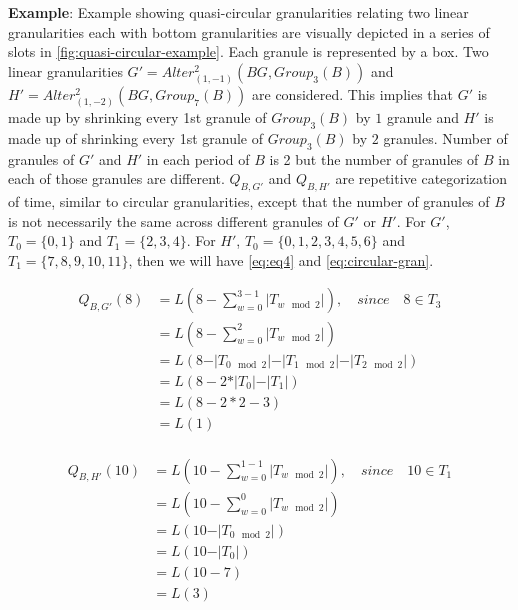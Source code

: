 \documentclass[12pt]{article}
\begin{document}
\textbf{Example}: Example showing quasi-circular granularities relating two linear granularities each with bottom granularities are visually depicted in a series of slots in \autoref{fig:quasi-circular-example}. Each granule is represented by a box. Two linear granularities \(G' = Alter^{2}_{(1,-1)}(BG, Group_3(B))\) and \(H' = Alter^{2}_{(1,-2)}(BG, Group_7(B))\) are considered. This implies that \(G'\) is made up by shrinking every 1st granule of \(Group_3(B)\) by \(1\) granule and \(H'\) is made up of shrinking every 1st granule of \(Group_3(B)\) by \(2\) granules. Number of granules of \(G'\) and \(H'\) in each period of \(B\) is 2 but the number of granules of \(B\) in each of those granules are different. \(Q_{B, G'}\) and \(Q_{B, H'}\) are repetitive categorization of time, similar to circular granularities, except that the number of granules of \(B\) is not necessarily the same across different granules of \(G'\) or \(H'\). For \(G'\), \(T_0 = \{0,1\}\) and \(T_1 = \{2, 3, 4\}\). For \(H'\), \(T_0 = \{0, 1, 2, 3, 4, 5, 6\}\) and \(T_1 = \{7, 8, 9, 10, 11\}\), then we will have \autoref{eq:eq4} and \autoref{eq:circular-gran}.

\begin{equation} \label{eq:eq4}
\begin{split}
Q_{B,G'}(8) & = L(8 - \sum_{w=0}^{3-1}\vert T_{w \mod 2}\vert) ,\quad since \quad 8 \in T_{3} \\
  & = L(8 - \sum_{w=0}^{2}\vert T_{w\mod 2}\vert) \\
  & = L(8 - \vert T_{0 \mod 2}\vert - \vert T_{1 \mod 2}\vert - \vert T_{2 \mod 2}\vert) \\
  & = L(8 - 2*\vert T_{0}\vert - \vert T_{1}\vert) \\
  & = L(8 - 2*2 - 3) \\
  & = L(1) \\
\end{split}
\end{equation}

\begin{equation} \label{eq:eq5}
\begin{split}
Q_{B,H'}(10) & = L(10 - \sum_{w=0}^{1-1}\vert T_{w \mod 2}\vert) ,\quad since \quad  10 \in T_{1}  \\
  & = L(10 - \sum_{w=0}^{0}\vert T_{w\mod 2}\vert) \\
  & = L(10 - \vert T_{0 \mod 2}\vert) \\
  & = L(10 - \vert T_{0}\vert) \\
  & = L(10 - 7) \\
  & = L(3) \\
\end{split}
\end{equation}
\end{document}
